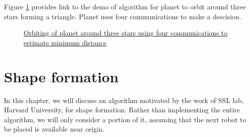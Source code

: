\documentclass{report}[12pt]
\begin{document}
Figure \ref{fig:orbit_three_stars} provides link to the demo of algorithm for planet to orbit around three stars forming a triangle. Planet uses four communications to make a descision.
\begin{figure}[H]
    \centering
    \caption{\href{https://youtu.be/5aZm0Os9BPc}{Orbiting of planet around three stars using four communications to estimate minimum distance}}
    \label{fig:orbit_three_stars}
\end{figure}

\chapter{Shape formation}
In this chapter, we will discuss an algorithm motivated by the work \cite{MR-AC-RN:2014} of SSL lab, Harvard University, for shape formation. Rather than implementing the entire algorithm, we will only consider a portion of it, assuming that the next robot to be placed is available near origin.
\end{document}

